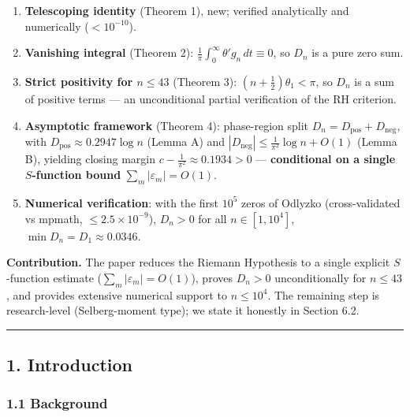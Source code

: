 \documentclass[
]{article}
\providecommand{\tightlist}{%
  \setlength{\itemsep}{0pt}\setlength{\parskip}{0pt}}
\begin{document}
\begin{enumerate}
\def\labelenumi{\arabic{enumi}.}
\tightlist
\item
  \textbf{Telescoping identity} (Theorem 1), new; verified analytically
  and numerically (\(<10^{-10}\)).
\item
  \textbf{Vanishing integral} (Theorem 2):
  \(\frac1\pi\int_0^\infty\theta'g_n\,dt \equiv 0\), so \(D_n\) is a
  pure zero sum.
\item
  \textbf{Strict positivity for \(n \le 43\)} (Theorem 3):
  \((n+\tfrac12)\theta_1 < \pi\), so \(D_n\) is a sum of positive terms
  --- an unconditional partial verification of the RH criterion.
\item
  \textbf{Asymptotic framework} (Theorem 4): phase-region split
  \(D_n = D_{\mathrm{pos}}+D_{\mathrm{neg}}\), with
  \(D_{\mathrm{pos}} \approx 0.2947\log n\) (Lemma A) and
  \(|D_{\mathrm{neg}}| \le \frac{1}{\pi^2}\log n + O(1)\) (Lemma B),
  yielding closing margin \(c-\tfrac{1}{\pi^2} \approx 0.1934 > 0\) ---
  \textbf{conditional on a single \(S\)-function bound}
  \(\sum_m|\varepsilon_m|=O(1)\).
\item
  \textbf{Numerical verification}: with the first \(10^5\) zeros of
  Odlyzko (cross-validated vs mpmath, \(\le 2.5\times10^{-9}\)),
  \(D_n > 0\) for all \(n \in [1, 10^4]\),
  \(\min D_n = D_1 \approx 0.0346\).
\end{enumerate}

\textbf{Contribution.} The paper reduces the Riemann Hypothesis to a
single explicit \(S\)-function estimate
(\(\sum_m|\varepsilon_m| = O(1)\)), proves \(D_n>0\) unconditionally for
\(n\le43\), and provides extensive numerical support to \(n\le10^4\).
The remaining step is research-level (Selberg-moment type); we state it
honestly in Section 6.2.

\begin{center}\rule{0.5\linewidth}{0.5pt}\end{center}

\hypertarget{introduction}{%
\subsection{1. Introduction}\label{introduction}}

\hypertarget{background}{%
\subsubsection{1.1 Background}\label{background}}
\end{document}
